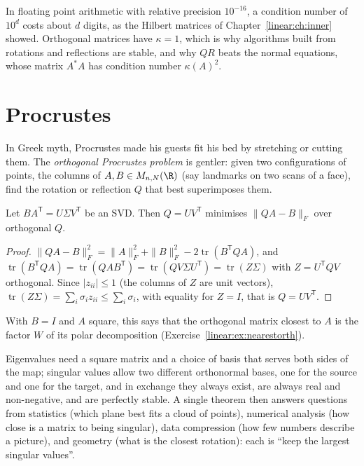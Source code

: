 In floating point arithmetic with relative precision $10^{-16}$, a condition number of $10^{d}$ costs about $d$ digits, as
the Hilbert matrices of Chapter~\ref{linear:ch:inner} showed. Orthogonal matrices have $\kappa=1$, which is why algorithms built from
rotations and reflections are stable, and why $QR$ beats the normal equations, whose matrix $A^*A$ has condition number
$\kappa(A)^2$.

\section{Procrustes}

In Greek myth, Procrustes made his guests fit his bed by stretching or cutting them. The \emph{orthogonal Procrustes problem}
is gentler: given two configurations of points, the columns of $A,B\in M_{n,N}(\R)$ (say landmarks on two scans of a face),
find the rotation or reflection $Q$ that best superimposes them.

\begin{theorem}\label{linear:thm:procrustes}
Let $BA^{\mathsf T}=U\Sigma V^{\mathsf T}$ be an SVD. Then $Q=UV^{\mathsf T}$ minimises $\|QA-B\|_F$ over orthogonal $Q$.
\end{theorem}
\begin{proof}
$\|QA-B\|_F^2=\|A\|_F^2+\|B\|_F^2-2\operatorname{tr}(B^{\mathsf T}QA)$, and $\operatorname{tr}(B^{\mathsf T}QA)=\operatorname{tr}(QAB^{\mathsf T})
=\operatorname{tr}(QV\Sigma U^{\mathsf T})=\operatorname{tr}(Z\Sigma)$ with $Z=U^{\mathsf T}QV$ orthogonal. Since $|z_{ii}|\le1$
(the columns of $Z$ are unit vectors), $\operatorname{tr}(Z\Sigma)=\sum_i\sigma_iz_{ii}\le\sum_i\sigma_i$, with equality for
$Z=I$, that is $Q=UV^{\mathsf T}$.
\end{proof}

With $B=I$ and $A$ square, this says that the orthogonal matrix closest to $A$ is the factor $W$ of its polar decomposition
(Exercise~\ref{linear:ex:nearestorth}).

\begin{beauty}
Eigenvalues need a square matrix and a choice of basis that serves both sides of the map; singular values allow two
different orthonormal bases, one for the source and one for the target, and in exchange they always exist, are always real
and non-negative, and are perfectly stable. A single theorem then answers questions from statistics (which plane best fits a
cloud of points), numerical analysis (how close is a matrix to being singular), data compression (how few numbers describe a
picture), and geometry (what is the closest rotation): each is ``keep the largest singular values''.
\end{beauty}

